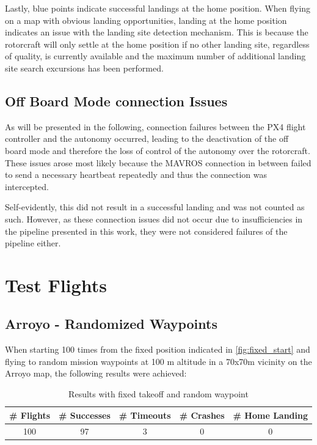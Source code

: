 Lastly, blue points indicate successful landings at the home position. When flying on a map with obvious landing opportunities, landing at the home position indicates an issue with the landing site detection mechanism. This is because the rotorcraft will only settle at the home position if no other landing site, regardless of quality, is currently available and the maximum number of additional landing site search excursions%
has been performed.

\subsection{Off Board Mode connection Issues}
As will be presented in the following, connection failures between the PX4 flight controller and the autonomy occurred, leading to the deactivation of the off board mode and therefore the loss of control of the autonomy over the rotorcraft. These issues arose most likely because the MAVROS connection in between failed to send a necessary heartbeat repeatedly and thus the connection was intercepted.

Self-evidently, this did not result in a successful landing and was not counted as such. However, as these connection issues did not occur due to insufficiencies in the pipeline presented in this work, they were not considered failures of the pipeline either.
\clearpage
\section{Test Flights}
\subsection{Arroyo - Randomized Waypoints}

When starting 100 times from the fixed position indicated in \cref{fig:fixed_start} and flying to random mission waypoints at 100 m altitude in a 70x70m vicinity on the Arroyo map, the following results were achieved:

\begin{table}[h]
    \begin{center}
     \caption{Results with fixed takeoff and random waypoint}\vspace{1ex}
     \label{tab:result_random_waypoint}
     \begin{tabular}{|c|c|c|c|c|}
     \hline
     \# Flights & \# Successes & \# Timeouts & \# Crashes & \# Home Landing\\ \hline \hline
     100 & 97 & 3 & 0 & 0 \\%
     \hline
     \end{tabular}
    \end{center}
    \end{table}

